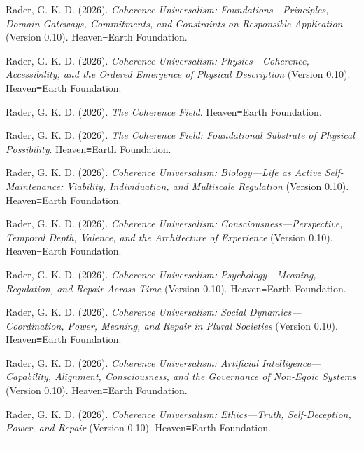 \documentclass[
  11pt,
]{article}
\begin{document}
Rader, G. K. D. (2026). \emph{Coherence Universalism:
Foundations---Principles, Domain Gateways, Commitments, and Constraints
on Responsible Application} (Version 0.10). Heaven≡Earth Foundation.

Rader, G. K. D. (2026). \emph{Coherence Universalism:
Physics---Coherence, Accessibility, and the Ordered Emergence of
Physical Description} (Version 0.10). Heaven≡Earth Foundation.

Rader, G. K. D. (2026). \emph{The Coherence Field}. Heaven≡Earth
Foundation.

Rader, G. K. D. (2026). \emph{The Coherence Field: Foundational
Substrate of Physical Possibility}. Heaven≡Earth Foundation.

Rader, G. K. D. (2026). \emph{Coherence Universalism: Biology---Life as
Active Self-Maintenance: Viability, Individuation, and Multiscale
Regulation} (Version 0.10). Heaven≡Earth Foundation.

Rader, G. K. D. (2026). \emph{Coherence Universalism:
Consciousness---Perspective, Temporal Depth, Valence, and the
Architecture of Experience} (Version 0.10). Heaven≡Earth Foundation.

Rader, G. K. D. (2026). \emph{Coherence Universalism:
Psychology---Meaning, Regulation, and Repair Across Time} (Version
0.10). Heaven≡Earth Foundation.

Rader, G. K. D. (2026). \emph{Coherence Universalism: Social
Dynamics---Coordination, Power, Meaning, and Repair in Plural Societies}
(Version 0.10). Heaven≡Earth Foundation.

Rader, G. K. D. (2026). \emph{Coherence Universalism: Artificial
Intelligence---Capability, Alignment, Consciousness, and the Governance
of Non-Egoic Systems} (Version 0.10). Heaven≡Earth Foundation.

Rader, G. K. D. (2026). \emph{Coherence Universalism: Ethics---Truth,
Self-Deception, Power, and Repair} (Version 0.10). Heaven≡Earth
Foundation.

\begin{center}\rule{0.5\linewidth}{0.5pt}\end{center}
\end{document}
